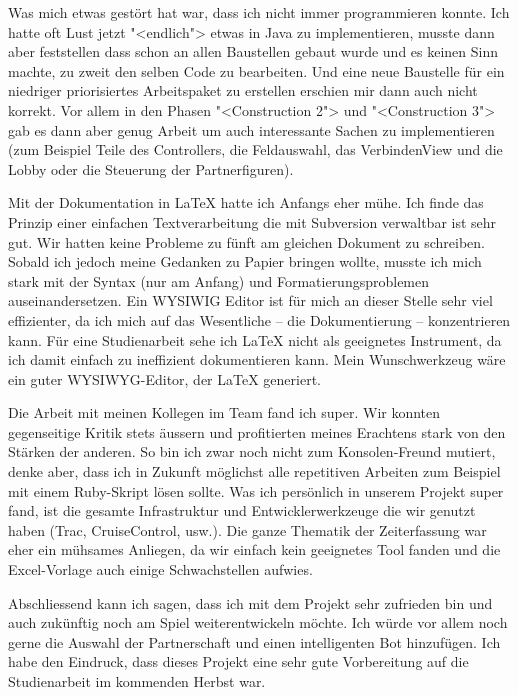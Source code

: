 \documentclass[12pt,halfparskip]{scrartcl}
\begin{document}
Was mich etwas gestört hat war, dass ich nicht immer programmieren konnte. Ich hatte oft Lust jetzt "<endlich"> etwas in Java zu implementieren, musste dann aber feststellen dass schon an allen Baustellen gebaut wurde und es keinen Sinn machte, zu zweit den selben Code zu bearbeiten. Und eine neue Baustelle für ein niedriger priorisiertes Arbeitspaket zu erstellen erschien mir dann auch nicht korrekt. Vor allem in den Phasen "<Construction 2"> und "<Construction 3"> gab es dann aber genug Arbeit um auch interessante Sachen zu implementieren (zum Beispiel Teile des Controllers, die Feldauswahl, das VerbindenView und die Lobby oder die Steuerung der Partnerfiguren).

Mit der Dokumentation in \LaTeX{} hatte ich Anfangs eher mühe. Ich finde das Prinzip einer einfachen Textverarbeitung die mit Subversion verwaltbar ist sehr gut. Wir hatten keine Probleme zu fünft am gleichen Dokument zu schreiben. Sobald ich jedoch meine Gedanken zu Papier bringen wollte, musste ich mich stark mit der Syntax (nur am Anfang) und Formatierungsproblemen auseinandersetzen. Ein WYSIWIG Editor ist für mich an dieser Stelle sehr viel effizienter, da ich mich auf das Wesentliche -- die Dokumentierung -- konzentrieren kann. Für eine Studienarbeit sehe ich \LaTeX{} nicht als geeignetes Instrument, da ich damit einfach zu ineffizient dokumentieren kann. Mein Wunschwerkzeug wäre ein guter WYSIWYG-Editor, der \LaTeX{} generiert.

Die Arbeit mit meinen Kollegen im Team fand ich super. Wir konnten gegenseitige Kritik stets äussern und profitierten meines Erachtens stark von den Stärken der anderen. So bin ich zwar noch nicht zum Konsolen-Freund mutiert, denke aber, dass ich in Zukunft möglichst alle repetitiven Arbeiten zum Beispiel mit einem Ruby-Skript lösen sollte. Was ich persönlich in unserem Projekt super fand, ist die gesamte Infrastruktur und Entwicklerwerkzeuge die wir genutzt haben (Trac, CruiseControl, usw.). Die ganze Thematik der Zeiterfassung war eher ein mühsames Anliegen, da wir einfach kein geeignetes Tool fanden und die Excel-Vorlage auch einige Schwachstellen aufwies.
			
Abschliessend kann ich sagen, dass ich mit dem Projekt sehr zufrieden bin und auch zukünftig noch am Spiel weiterentwickeln möchte. Ich würde vor allem noch gerne die Auswahl der Partnerschaft und einen intelligenten Bot hinzufügen. Ich habe den Eindruck, dass dieses Projekt eine sehr gute Vorbereitung auf die Studienarbeit im kommenden Herbst war.
\end{document}
